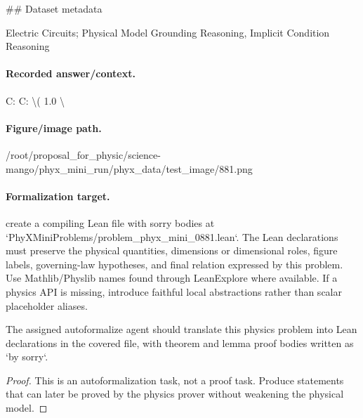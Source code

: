 \#\# Dataset metadata

Electric Circuits; Physical Model Grounding Reasoning, Implicit Condition Reasoning

\paragraph{Recorded answer/context.}
C: C: \textbackslash{}( 1.0 \textbackslash{}

\paragraph{Figure/image path.}
/root/proposal\_for\_physic/science-mango/phyx\_mini\_run/phyx\_data/test\_image/881.png

\paragraph{Formalization target.}
create a compiling Lean file with sorry bodies at `PhyXMiniProblems/problem\_phyx\_mini\_0881.lean`. The Lean declarations must preserve the physical quantities, dimensions or dimensional roles, figure labels, governing-law hypotheses, and final relation expressed by this problem.
Use Mathlib/Physlib names found through LeanExplore where available. If a physics API is missing, introduce faithful local abstractions rather than scalar placeholder aliases.

\begin{theorem}
\label{thm:physics:phyx_mini_0881:target}
The assigned autoformalize agent should translate this physics problem into Lean declarations in the covered file, with theorem and lemma proof bodies written as `by sorry`.
\end{theorem}
\begin{proof}
This is an autoformalization task, not a proof task. Produce statements that can later be proved by the physics prover without weakening the physical model.
\end{proof}

